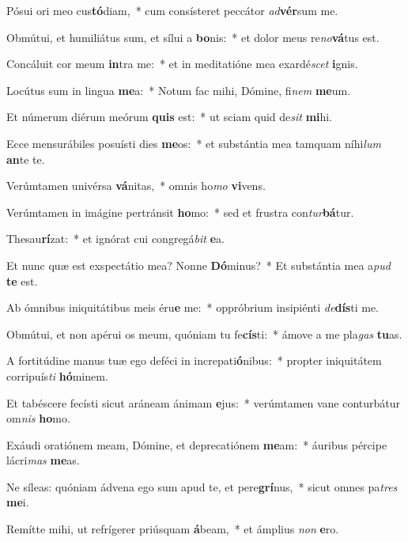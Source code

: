 \item Pósui ori meo cus\textbf{tó}diam,~* cum consísteret peccátor \textit{ad}\textbf{vér}sum me.
\item Obmútui, et humiliátus sum, et sílui a \textbf{bo}nis:~* et dolor meus re\textit{no}\textbf{vá}tus est.
\item Concáluit cor meum \textbf{in}tra me:~* et in meditatióne mea exardé\textit{scet} \textbf{i}gnis.
\item Locútus sum in lingua \textbf{me}a:~* Notum fac mihi, Dómine, fi\textit{nem} \textbf{me}um.
\item Et númerum diérum meórum \textbf{quis} est:~* ut sciam quid de\textit{sit} \textbf{mi}hi.
\item Ecce mensurábiles posuísti dies \textbf{me}os:~* et substántia mea tamquam níhi\textit{lum} \textbf{an}te te.
\item Verúmtamen univérsa \textbf{vá}nitas,~* omnis ho\textit{mo} \textbf{vi}vens.
\item Verúmtamen in imágine pertránsit \textbf{ho}mo:~* sed et frustra con\textit{tur}\textbf{bá}tur.
\item Thesau\textbf{rí}zat:~* et ignórat cui congregá\textit{bit} \textbf{e}a.
\item Et nunc quæ est exspectátio mea? Nonne \textbf{Dó}minus?~* Et substántia mea a\textit{pud} \textbf{te} est.
\item Ab ómnibus iniquitátibus meis éru\textbf{e} me:~* oppróbrium insipiénti \textit{de}\textbf{dís}ti me.
\item Obmútui, et non apérui os meum, quóniam tu fe\textbf{cís}ti:~* ámove a me pla\textit{gas} \textbf{tu}as.
\item A fortitúdine manus tuæ ego deféci in increpati\textbf{ó}nibus:~* propter iniquitátem corripuís\textit{ti} \textbf{hó}minem.
\item Et tabéscere fecísti sicut aráneam ánimam \textbf{e}jus:~* verúmtamen vane conturbátur om\textit{nis} \textbf{ho}mo.
\item Exáudi oratiónem meam, Dómine, et deprecatiónem \textbf{me}am:~* áuribus pércipe lácri\textit{mas} \textbf{me}as.
\item Ne síleas: quóniam ádvena ego sum apud te, et pere\textbf{grí}nus,~* sicut omnes pa\textit{tres} \textbf{me}i.
\item Remítte mihi, ut refrígerer priúsquam \textbf{á}beam,~* et ámplius \textit{non} \textbf{e}ro.
